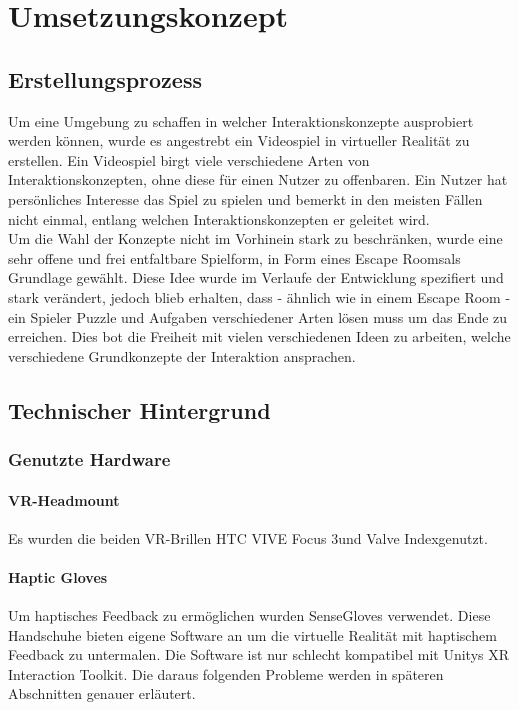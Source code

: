 \chapter{Umsetzungskonzept}

\section{Erstellungsprozess}
Um eine Umgebung zu schaffen in welcher Interaktionskonzepte ausprobiert werden können, wurde es angestrebt ein Videospiel in virtueller Realität zu erstellen. Ein Videospiel birgt viele verschiedene Arten von Interaktionskonzepten, ohne diese für einen Nutzer zu offenbaren. Ein Nutzer hat persönliches Interesse das Spiel zu spielen und bemerkt in den meisten Fällen nicht einmal, entlang welchen Interaktionskonzepten er geleitet wird.\\

Um die Wahl der Konzepte nicht im Vorhinein stark zu beschränken, wurde eine sehr offene und frei entfaltbare Spielform, in Form eines \dq Escape Rooms\dq als Grundlage gewählt. Diese Idee wurde im Verlaufe der Entwicklung spezifiert und stark verändert, jedoch blieb erhalten, dass - ähnlich wie in einem Escape Room - ein Spieler Puzzle und Aufgaben verschiedener Arten lösen muss um das Ende zu erreichen. Dies bot die Freiheit mit vielen verschiedenen Ideen zu arbeiten, welche verschiedene Grundkonzepte der Interaktion ansprachen.


\section{Technischer Hintergrund}

\subsection{Genutzte Hardware}

\subsubsection{VR-Headmount}
Es wurden die beiden VR-Brillen \dq HTC VIVE Focus 3\dq und \dq Valve Index\dq genutzt.

\subsubsection{Haptic Gloves}
Um haptisches Feedback zu ermöglichen wurden \dq SenseGloves \dq verwendet. Diese Handschuhe bieten eigene Software an um die virtuelle Realität mit haptischem Feedback zu untermalen. Die Software ist nur schlecht kompatibel mit Unitys XR Interaction Toolkit. Die daraus folgenden Probleme werden in späteren Abschnitten genauer erläutert. 

